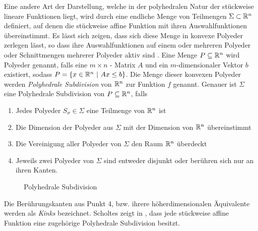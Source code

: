 Eine andere Art der Darstellung, welche in der polyhedralen Natur der stückweise lineare Funktionen liegt, wird durch eine endliche Menge von Teilmengen $\Sigma\subset \mathbb{R}^n$ definiert, auf denen die stückweise affine Funktion mit ihren Auswahlfunktionen übereinstimmt. Es lässt sich zeigen, dass sich diese Menge in konvexe Polyeder zerlegen lässt, so dass ihre Auswahlfunktionen auf einem oder mehreren Polyeder oder Schnittmengen mehrerer Polyeder aktiv sind \cite[S.23 ff.]{scholtes2012introduction}.
 Eine Menge $P\subseteq \mathbb{R}^n$ wird Polyeder genannt, falls eine $m\times n$ - Matrix $A$ und ein $m$-dimensionaler Vektor $b$ existiert, sodass $P = \lbrace x\in \mathbb{R}^n ~|~ Ax\leq b \rbrace$. 
Die Menge dieser konvexen Polyeder werden \textit{Polyhedrale Subdivision} von $\mathbb{R}^n$ zur Funktion $f$ genannt. Genauer ist $\Sigma$ eine Polyhedrale Subdivision von $P \subseteq \mathbb{R}^n$, falls
\begin{enumerate}
 \item Jedes Polyeder $S_\sigma \in \Sigma$ eine Teilmenge von $\mathbb{R}^n$ ist
 \item Die Dimension der Polyeder aus $\Sigma$ mit der Dimension von $\mathbb{R}^n$ übereinstimmt
 \item Die Vereinigung aller Polyeder von $\Sigma$ den Raum $\mathbb{R}^n$ überdeckt
 \item Jeweils zwei Polyeder von $\Sigma$ sind entweder disjunkt oder berühren sich nur an ihren Kanten.
\end{enumerate}
\begin{figure}[H]
\centering

\caption{Polyhedrale Subdivision}
\label{fig:polyhedralSubdivision}
\end{figure}
Die Berührungskanten aus Punkt 4, bzw. ihrere höherdimensionalen Äquivalente werden als \textit{Kinks} bezeichnet. 
Scholtes zeigt in \cite[Prop. 2.2.3.]{scholtes2012introduction}, dass jede stückweise affine Funktion eine zugehörige Polyhedrale Subdivision besitzt.

